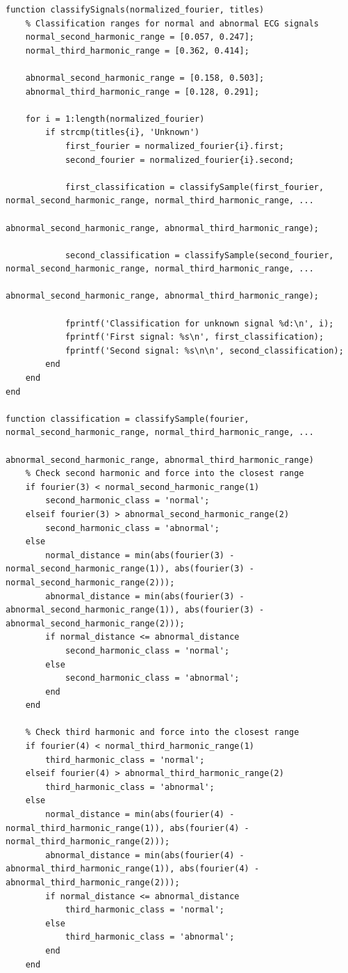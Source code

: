 \documentclass{zc-ust-hw}
\begin{document}
\begin{verbatim}
function classifySignals(normalized_fourier, titles)
    % Classification ranges for normal and abnormal ECG signals
    normal_second_harmonic_range = [0.057, 0.247];
    normal_third_harmonic_range = [0.362, 0.414];
    
    abnormal_second_harmonic_range = [0.158, 0.503];
    abnormal_third_harmonic_range = [0.128, 0.291];
    
    for i = 1:length(normalized_fourier)
        if strcmp(titles{i}, 'Unknown')
            first_fourier = normalized_fourier{i}.first;
            second_fourier = normalized_fourier{i}.second;
            
            first_classification = classifySample(first_fourier, normal_second_harmonic_range, normal_third_harmonic_range, ...
                                                  abnormal_second_harmonic_range, abnormal_third_harmonic_range);
            
            second_classification = classifySample(second_fourier, normal_second_harmonic_range, normal_third_harmonic_range, ...
                                                   abnormal_second_harmonic_range, abnormal_third_harmonic_range);
            
            fprintf('Classification for unknown signal %d:\n', i);
            fprintf('First signal: %s\n', first_classification);
            fprintf('Second signal: %s\n\n', second_classification);
        end
    end
end

function classification = classifySample(fourier, normal_second_harmonic_range, normal_third_harmonic_range, ...
                                         abnormal_second_harmonic_range, abnormal_third_harmonic_range)
    % Check second harmonic and force into the closest range
    if fourier(3) < normal_second_harmonic_range(1)
        second_harmonic_class = 'normal';
    elseif fourier(3) > abnormal_second_harmonic_range(2)
        second_harmonic_class = 'abnormal';
    else
        normal_distance = min(abs(fourier(3) - normal_second_harmonic_range(1)), abs(fourier(3) - normal_second_harmonic_range(2)));
        abnormal_distance = min(abs(fourier(3) - abnormal_second_harmonic_range(1)), abs(fourier(3) - abnormal_second_harmonic_range(2)));
        if normal_distance <= abnormal_distance
            second_harmonic_class = 'normal';
        else
            second_harmonic_class = 'abnormal';
        end
    end
    
    % Check third harmonic and force into the closest range
    if fourier(4) < normal_third_harmonic_range(1)
        third_harmonic_class = 'normal';
    elseif fourier(4) > abnormal_third_harmonic_range(2)
        third_harmonic_class = 'abnormal';
    else
        normal_distance = min(abs(fourier(4) - normal_third_harmonic_range(1)), abs(fourier(4) - normal_third_harmonic_range(2)));
        abnormal_distance = min(abs(fourier(4) - abnormal_third_harmonic_range(1)), abs(fourier(4) - abnormal_third_harmonic_range(2)));
        if normal_distance <= abnormal_distance
            third_harmonic_class = 'normal';
        else
            third_harmonic_class = 'abnormal';
        end
    end
    

\end{verbatim}
\end{document}
